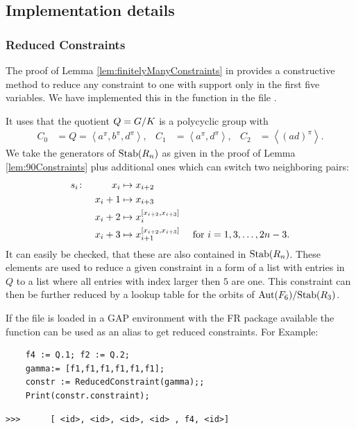 \documentclass[a4paper,11pt]{amsart}
\begin{document}
\subsection{Implementation details}
\label{sec:gap_details}
\subsubsection{Reduced Constraints}
The proof of Lemma \ref{lem:finitelyManyConstraints} in \cite{Lysenok:QudraticEquationsInGrig} 
provides a constructive method to reduce any constraint to one with support
only in the first five variables. 
We have implemented this in the function  in the file
.

It uses that the quotient $Q={G/K}$ is a polycyclic group with 
\begin{align*}
 C_0 &= Q = \left<a^\pi,b^\pi,d^\pi\right>, &
 C_1 &= \left<a^\pi,d^\pi\right>, &
 C_2 &= \left<(ad)^\pi\right>.
\end{align*}
We take the generators of $\textup{Stab}(R_n)$ as given in the proof of Lemma \ref{lem:90Constraints}
plus additional ones which can switch two neighboring pairs:
\begin{align*}
 s_i &\colon &x_i&\mapsto x_{i+2}&\\
	    &&x_i+1&\mapsto x_{i+3}&\\
	    &&x_i+2&\mapsto x_{i}^{[x_{i+2},x_{i+3}]}&\\
	    &&x_i+3&\mapsto x_{i+1}^{[x_{i+2},x_{i+3}]} & \textup{ for }i = 1,3,\ldots,2n-3.
\end{align*}
It can easily be checked, that these are also contained in $\textup{Stab}(R_n)$. These elements
are used to reduce a given constraint in a form of a list with entries in $Q$ to a
list where all entries with index larger then $5$ are one. 
This constraint can then be further reduced by a lookup table for the orbits
of ${\textup{Aut}(F_6)/\textup{Stab}(R_3)}$. 

If the file  is loaded in a GAP environment with the FR package available 
the function  can be used as an alias to get 
reduced constraints. For Example:
 \begin{lstlisting}
    f4 := Q.1; f2 := Q.2;
    gamma:= [f1,f1,f1,f1,f1,f1];
    constr := ReducedConstraint(gamma);;
    Print(constr.constraint);
\end{lstlisting} 
\begin{verbatim}
>>>      [ <id>, <id>, <id>, <id> , f4, <id>]
\end{verbatim} 
\end{document}
